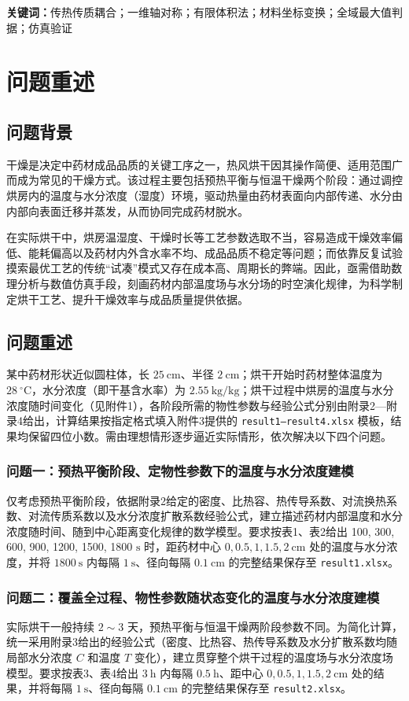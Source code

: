 \documentclass[12pt,a4paper]{article}
\begin{document}
\noindent\textbf{关键词：}传热传质耦合；一维轴对称；有限体积法；材料坐标变换；全域最大值判据；仿真验证

\clearpage

\section{问题重述}
\subsection{问题背景}
干燥是决定中药材成品品质的关键工序之一，热风烘干因其操作简便、适用范围广而成为常见的干燥方式。该过程主要包括预热平衡与恒温干燥两个阶段：通过调控烘房内的温度与水分浓度（湿度）环境，驱动热量由药材表面向内部传递、水分由内部向表面迁移并蒸发，从而协同完成药材脱水。

在实际烘干中，烘房温湿度、干燥时长等工艺参数选取不当，容易造成干燥效率偏低、能耗偏高以及药材内外含水率不均、成品品质不稳定等问题；而依靠反复试验摸索最优工艺的传统“试凑”模式又存在成本高、周期长的弊端。因此，亟需借助数理分析与数值仿真手段，刻画药材内部温度场与水分场的时空演化规律，为科学制定烘干工艺、提升干燥效率与成品质量提供依据。

\subsection{问题重述}
某中药材形状近似圆柱体，长 $25\ \mathrm{cm}$、半径 $2\ \mathrm{cm}$；烘干开始时药材整体温度为 $28\ \mathrm{^{\circ}C}$，水分浓度（即干基含水率）为 $2.55\ \mathrm{kg/kg}$；烘干过程中烘房的温度与水分浓度随时间变化（见附件1），各阶段所需的物性参数与经验公式分别由附录2—附录4给出，计算结果按指定格式填入附件3提供的 \texttt{result1—result4.xlsx} 模板，结果均保留四位小数。需由理想情形逐步逼近实际情形，依次解决以下四个问题。

\subsubsection{问题一：预热平衡阶段、定物性参数下的温度与水分浓度建模}
仅考虑预热平衡阶段，依据附录2给定的密度、比热容、热传导系数、对流换热系数、对流传质系数以及水分浓度扩散系数经验公式，建立描述药材内部温度和水分浓度随时间、随到中心距离变化规律的数学模型。要求按表1、表2给出 100, 300, 600, 900, 1200, 1500, 1800 $\mathrm{s}$ 时，距药材中心 $0, 0.5, 1, 1.5, 2\ \mathrm{cm}$ 处的温度与水分浓度，并将 $1800\ \mathrm{s}$ 内每隔 $1\ \mathrm{s}$、径向每隔 $0.1\ \mathrm{cm}$ 的完整结果保存至 \texttt{result1.xlsx}。

\subsubsection{问题二：覆盖全过程、物性参数随状态变化的温度与水分浓度建模}
实际烘干一般持续 $2\sim3$ 天，预热平衡与恒温干燥两阶段参数不同。为简化计算，统一采用附录3给出的经验公式（密度、比热容、热传导系数及水分扩散系数均随局部水分浓度 $C$ 和温度 $T$ 变化），建立贯穿整个烘干过程的温度场与水分浓度场模型。要求按表3、表4给出 $3\ \mathrm{h}$ 内每隔 $0.5\ \mathrm{h}$、距中心 $0, 0.5, 1, 1.5, 2\ \mathrm{cm}$ 处的结果，并将每隔 $1\ \mathrm{s}$、径向每隔 $0.1\ \mathrm{cm}$ 的完整结果保存至 \texttt{result2.xlsx}。
\end{document}
